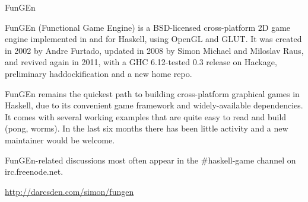 \begin{hcarentry}[new]{FunGEn}
\makeheader

FunGEn (Functional Game Engine) is a BSD-licensed cross-platform 2D
game engine implemented in and for Haskell, using OpenGL and GLUT. It
was created in 2002 by Andre Furtado, updated in 2008 by Simon Michael
and Miloslav Raus, and revived again in 2011, with a GHC 6.12-tested
0.3 release on Hackage, preliminary haddockification and a new home
repo.

FunGEn remains the quickest path to building cross-platform graphical
games in Haskell, due to its convenient game framework and
widely-available dependencies. It comes with several working examples
that are quite easy to read and build (pong, worms). In the last six
months there has been little activity and a new maintainer would be
welcome. 

FunGEn-related discussions most often appear in the \#haskell-game
channel on irc.freenode.net.

\FurtherReading
  \url{http://darcsden.com/simon/fungen}
\end{hcarentry}
